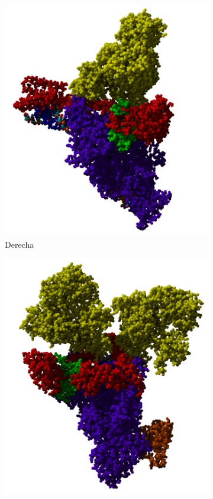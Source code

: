 \documentclass[a4paper,11pt]{report}
\begin{document}
  \begin{figure}[h]
 	\centering
	 \begin{subfigure}{0.3\textwidth}
	 	\includegraphics[width=\linewidth]{Figuras/Figura39}
	 	\caption{Derecha} 	
	 \end{subfigure}
	 \begin{subfigure}{0.3\textwidth}
	 	\includegraphics[width=\linewidth]{Figuras/Figura40}

\end{subfigure}
\end{figure}
\end{document}
